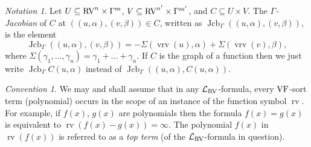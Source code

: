 \documentclass[12pt]{amsart}
\newcommand{\memph}[1]{{\color{magenta}\emph{#1}}}
\theoremstyle{plain}
\theoremstyle{definition}
\theoremstyle{remark}
\newtheorem{nota}[thm]{Notation}
\newtheorem{conv}[thm]{Convention}
\numberwithin{equation}{section}
\theoremstyle{plain}
\newcommand{\VF}{\textup{VF}}
\newcommand{\RV}{\textup{RV}}
\DeclareMathOperator{\jcb}{Jcb}
\newcommand{\0}{\emptyset}
\newcommand{\lan}[3]{\mathcal{L}_{#1 \textup{#2} #3}}
\newcommand{\sub}{\subseteq}
\DeclareMathOperator{\rv}{rv}
\DeclareMathOperator{\vrv}{vrv}
\begin{document}
\begin{nota}\label{jcbG:op}
Let $U \sub \RV^n \times \Gamma^m$, $V \sub \RV^{n'} \times \Gamma^{m'}$, and $C \sub U \times V$. The \memph{$\Gamma$-Jacobian} of $C$ at $((u, \alpha), (v, \beta)) \in C$, written as $\jcb_{\Gamma} ((u, \alpha), (v, \beta))$, is the element
\[
\jcb_{\Gamma} ((u, \alpha), (v, \beta)) =  - \Sigma (\vrv(u), \alpha) + \Sigma (\vrv(v), \beta),
\]
where $\Sigma (\gamma_1, \ldots, \gamma_n) = \gamma_1 + \ldots + \gamma_n$. If $C$ is the graph of a function then we just write $\jcb_{\Gamma}C(u, \alpha)$ instead of $\jcb_\Gamma((u, \alpha), C(u, \alpha))$.
\end{nota}


%

\begin{conv}\label{topterm}
We may and shall assume that in any $\lan{}{RV}{}$-formula, every $\VF$-sort term (polynomial) occurs in the scope of an instance of the function symbol $\rv$. For example, if $f(x)$, $g(x)$ are polynomials then the formula $f(x) = g(x)$ is equivalent to $\rv(f(x) - g(x)) = \infty$. The polynomial $f(x)$ in $\rv(f(x))$ is referred to as a \memph{top term} (of the $\lan{}{RV}{}$-formula in question).
\end{conv}
\end{document}
